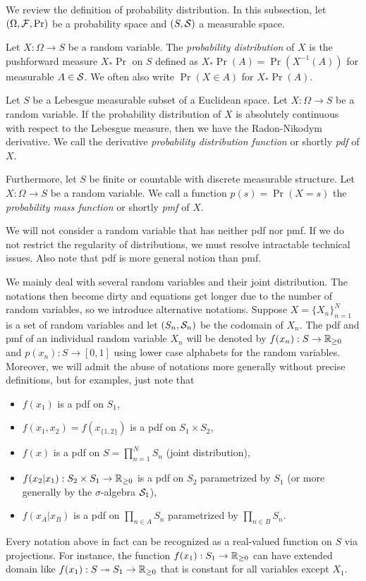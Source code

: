 \documentclass{../exp}
\begin{document}
We review the definition of probability distribution.
In this subsection, let $(\Omega,\mathcal{F},\Pr)$ be a probability space and $(S,\mathcal{S})$ a measurable space.
\begin{defn}
Let $X:\Omega\to S$ be a random variable.
The \emph{probability distribution} of $X$ is the pushforward measure $X_*\Pr$ on $S$ defined as $X_*\Pr(A)=\Pr(X^{-1}(A))$ for measurable $A\in\mathcal{S}$.
We often also write $\Pr(X\in A)$ for $X_*\Pr(A)$.
\end{defn}
\begin{defn}
Let $S$ be a Lebesgue measurable subset of a Euclidean space.
Let $X:\Omega\to S$ be a random variable.
If the probability distribution of $X$ is absolutely continuous with respect to the Lebesgue measure, then we have the Radon-Nikodym derivative.
We call the derivative \emph{probability distribution function} or shortly \emph{pdf} of $X$.
\end{defn}
\begin{defn}
Furthermore, let $S$ be finite or countable with discrete measurable structure.
Let $X:\Omega\to S$ be a random variable.
We call a function $p(s)=\Pr(X=s)$ the \emph{probability mass function} or shortly \emph{pmf} of $X$.
\end{defn}

We will not consider a random variable that has neither pdf nor pmf.
If we do not restrict the regularity of distributions, we must resolve intractable technical issues.
Also note that pdf is more general notion than pmf.

We mainly deal with several random variables and their joint distribution.
The notations then become dirty and equations get longer due to the number of random variables, so we introduce alternative notations.
Suppose $X=\{X_n\}_{n=1}^N$ is a set of random variables and let $(S_n,\mathcal{S}_n)$ be the codomain of $X_n$.
The pdf and pmf of an individual random variable $X_n$ will be denoted by $f(x_n):S\to\mathbb{R}_{\ge0}$ and $p(x_n):S\to[0,1]$ using lower case alphabets for the random variables.
Moreover, we will admit the abuse of notations more generally without precise definitions, but for examples, just note that
\begin{itemize}
\item $f(x_1)$ is a pdf on $S_1$,
\item $f(x_1,x_2)=f(x_{\{1,2\}})$ is a pdf on $S_1\times S_2$,
\item $f(x)$ is a pdf on $S=\prod_{n=1}^NS_n$ (joint distribution),
\item $f(x_2|x_1):S_2\times S_1\to\mathbb{R}_{\ge0}$ is a pdf on $S_2$ parametrized by $S_1$ (or more generally by the $\sigma$-algebra $\mathcal{S}_1$),
\item $f(x_A|x_B)$ is a pdf on $\prod_{n\in A}S_n$ parametrized by $\prod_{n\in B}S_n$.
\end{itemize}
Every notation above in fact can be recognized as a real-valued function on $S$ via projections.
For instance, the function $f(x_1):S_1\to\mathbb{R}_{\ge0}$ can have extended domain like $f(x_1):S\twoheadrightarrow S_1\to\mathbb{R}_{\ge0}$ that is constant for all variables except $X_1$.
\end{document}
